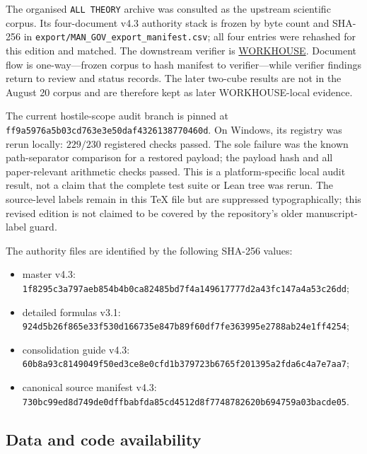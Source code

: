 \documentclass[11pt]{article}
\theoremstyle{plain}
\theoremstyle{definition}
\theoremstyle{remark}
\newcommand{\chk}[1]{}
\begin{document}
The organised \texttt{ALL THEORY} archive was consulted as
the upstream scientific corpus. Its four-document v4.3 authority stack is
frozen by byte count and SHA-256 in
\nolinkurl{export/MAN_GOV_export_manifest.csv}; all four entries were
rehashed for this edition and matched. The downstream verifier is
\href{https://github.com/ats314/WORKHOUSE}{WORKHOUSE}. Document flow is
one-way---frozen corpus to hash manifest to verifier---while verifier findings
return to review and status records. The later two-cube results are not in the
August 20 corpus and are therefore kept as later WORKHOUSE-local evidence.

The current hostile-scope audit branch is pinned at
\nolinkurl{ff9a5976a5b03cd763e3e50daf4326138770460d}. On Windows, its registry was
rerun locally: $229/230$ registered checks passed. The sole failure was the
known path-separator comparison for a restored payload; the payload hash and
all paper-relevant arithmetic checks passed. This is a platform-specific local
audit result, not a claim that the complete test suite or Lean tree was rerun.
The source-level \texttt{\string\chk} labels remain in this TeX file but are
suppressed typographically; this revised edition is not claimed to be covered
by the repository's older manuscript-label guard.

The authority files are identified by the following SHA-256 values:
\begin{itemize}
\item master v4.3:
  \nolinkurl{1f8295c3a797aeb854b4b0ca82485bd7f4a149617777d2a43fc147a4a53c26dd};
\item detailed formulas v3.1:
  \nolinkurl{924d5b26f865e33f530d166735e847b89f60df7fe363995e2788ab24e1ff4254};
\item consolidation guide v4.3:
  \nolinkurl{60b8a93c8149049f50ed3ce8e0cfd1b379723b6765f201395a2fda6c4a7e7aa7};
\item canonical source manifest v4.3:
  \nolinkurl{730bc99ed8d749de0dffbabfda85cd4512d8f7748782620b694759a03bacde05}.
\end{itemize}

\subsection{Data and code availability}
\end{document}
